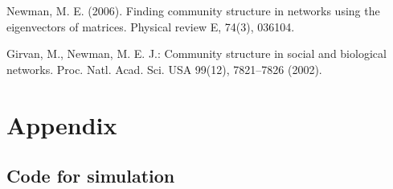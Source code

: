 \documentclass[runningheads]{llncs}
\begin{document}
\begin{thebibliography}{8}
    Newman, M. E. (2006). Finding community structure in networks using the eigenvectors of matrices. Physical review E, 74(3), 036104.

    Girvan, M., Newman, M. E. J.: Community structure in social and biological 
    networks. Proc. Natl. Acad. Sci. USA 99(12), 7821–7826 (2002). 
\end{thebibliography}

\section*{Appendix}

\subsection*{Code for simulation}
\end{document}
